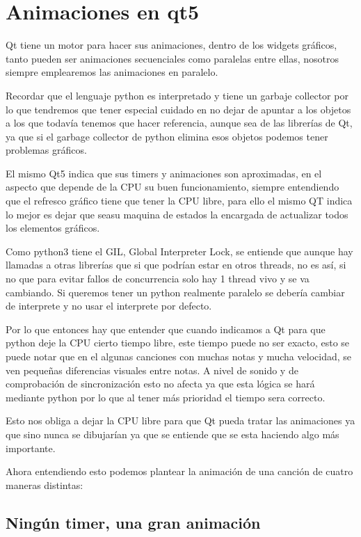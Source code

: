 \documentclass[a4paper,11pt,oneside]{book}
\begin{document}
\section{Animaciones en qt5}
Qt tiene un motor para hacer sus animaciones, dentro de los widgets gráficos, tanto pueden ser animaciones secuenciales como paralelas entre ellas, nosotros siempre emplearemos las animaciones en paralelo.


Recordar que el lenguaje python es interpretado y tiene un garbaje collector por lo que tendremos que tener especial cuidado en no dejar de apuntar a los objetos a los que todavía tenemos que hacer referencia, aunque sea de las librerías de Qt, ya que si el garbage collector de python elimina esos objetos podemos tener problemas gráficos.

El mismo Qt5 indica que sus timers y animaciones son aproximadas, en el aspecto que depende de la CPU su buen funcionamiento, siempre entendiendo que el refresco gráfico tiene que tener la CPU libre, para ello el mismo QT indica lo mejor es dejar que seasu maquina de estados la encargada de actualizar todos los elementos gráficos. 

Como python3 tiene el GIL, Global Interpreter Lock, se entiende que aunque hay llamadas a otras librerías que si que podrían estar en otros threads, no es así, si no que para evitar fallos de concurrencia solo hay 1 thread vivo y se va cambiando. Si queremos tener un python realmente paralelo se debería cambiar de interprete y no usar el interprete por defecto.

Por lo que entonces hay que entender que cuando indicamos a Qt para que python deje la CPU cierto tiempo libre, este tiempo puede no ser exacto, esto se puede notar que en el algunas canciones con muchas notas y mucha velocidad, se ven pequeñas diferencias visuales entre notas. A nivel de sonido y de comprobación de sincronización esto no afecta ya que esta lógica se hará mediante python por lo que al tener más prioridad el tiempo sera correcto.

Esto nos obliga a dejar la CPU libre para que Qt pueda tratar las animaciones ya que sino nunca se dibujarían ya que se entiende que se esta haciendo algo más importante.

Ahora entendiendo esto podemos plantear la animación de una canción de cuatro maneras distintas:

\subsection{Ningún timer, una gran animación}
\end{document}
